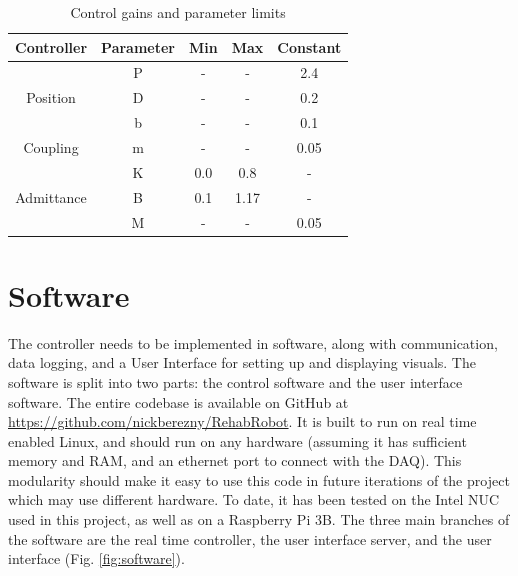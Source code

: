 \documentclass[12pt]{report}
\begin{document}
	\begin{table}[h] \label{tab:params}
	\centering
	\caption{Control gains and parameter limits}
	\begin{tabular}{c c c c c }
	\toprule
	Controller & Parameter & Min & Max & Constant  \\
	\midrule
	\rowcolor{gray!10} \cellcolor{white} & P & - & -  & 2.4  \\
	\multirow{-2}{*}{Position} \cellcolor{white} & D & - & - & 0.2 \\
	\midrule
	\rowcolor{gray!10} \cellcolor{white} & b & -  & -  & 0.1  \\
	\multirow{-2}{*}{Coupling} \cellcolor{white} & m & -  & -  & 0.05  \\
	\midrule
	\rowcolor{gray!10} \cellcolor{white} & K & 0.0 & 0.8  &  - \\
	\multirow{-1}{*}{Admittance} \cellcolor{white} & B & 0.1 & 1.17  & - \\
	\rowcolor{gray!10} \cellcolor{white} & M & - & -  & 0.05  \\
	\bottomrule
	\end{tabular}
	\end{table}	
	
	
			
	\section{Software} \label{sec:software} 

	The controller needs to be implemented in software, along with communication, data logging, and a User Interface for setting up and displaying visuals. The software is split into two parts: the control software and the user interface software. The entire codebase is available on GitHub at \href{https://github.com/nickberezny/RehabRobot}{https://github.com/nickberezny/RehabRobot}. It is built to run on real time enabled Linux, and should run on any hardware (assuming it has sufficient memory and RAM, and an ethernet port to connect with the DAQ). This modularity should make it easy to use this code in future iterations of the project which may use different hardware. To date, it has been tested on the Intel NUC used in this project, as well as on a Raspberry Pi 3B. The three main branches of the software are the real time controller, the user interface server, and the user interface (Fig. \ref{fig:software}).
	
\end{document}
